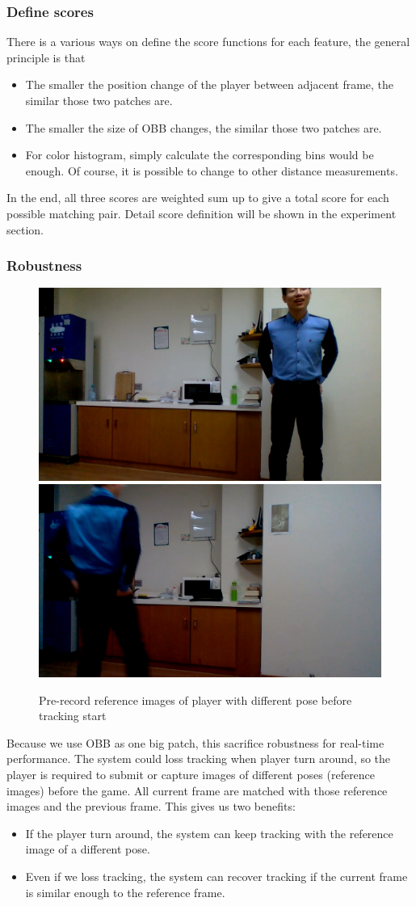 \documentclass[11pt,twocolumn,letterpaper]{article}
\begin{document}
\subsubsection*{Define scores}
There is a various ways on define the score functions for each feature, the general principle is that 
\begin{itemize}
\item The smaller the position change of the player between adjacent frame, the similar those two patches are.
\item The smaller the size of OBB changes, the similar those two patches are.
\item For color histogram, simply calculate the corresponding bins would be enough. Of course, it is possible to change to other distance measurements.
\end{itemize}
\par
In the end, all three scores are weighted sum up to give a total score for each possible matching pair. Detail score definition will be shown in the experiment section.
\subsubsection*{Robustness}
\begin{figure}[h]
      \centering
      \includegraphics[width=0.45\linewidth]{./Pic/ref-1}
\includegraphics[width=0.45\linewidth]{./Pic/ref-2}
      \caption{Pre-record reference images of player with different pose before tracking start}
      \end{figure}

Because we use OBB as one big patch, this sacrifice robustness for real-time performance. The system could loss tracking when player turn around, so the player is required to submit or capture images of different poses (reference images) before the game. All current frame are matched with those reference images and the previous frame. This gives us two benefits:
\begin{itemize}
\item If the player turn around, the system can keep tracking with the reference image of a different pose.
\item Even if we loss tracking, the system can recover tracking if the current frame is similar enough to the reference frame.
\end{itemize}
\end{document}
